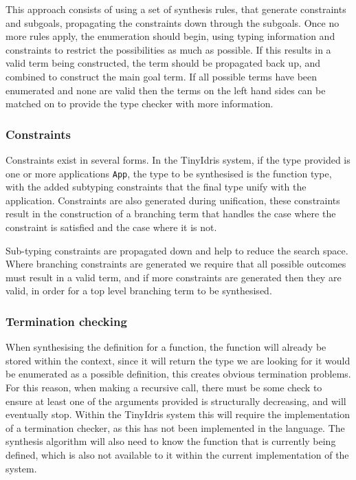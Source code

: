 \documentclass[a4paper]{article}
\begin{document}
This approach consists of using a set of synthesis rules, that generate constraints 
and subgoals, propagating the constraints down through the subgoals. Once no more rules apply, the enumeration should begin, using 
typing information and constraints to restrict the possibilities as much as possible. If this results in a valid term being constructed, the term should be 
propagated back up, and combined to construct the main goal term. If all possible terms have been enumerated and none are valid then 
the terms on the left hand sides can be matched on to provide the type checker with more information. 

\subsubsection{Constraints}
\label{sec:org233733e}
Constraints exist in several forms. In the TinyIdris system, if the type provided is one or more  
applications \texttt{App}, the type to be synthesised is the function type, with the added subtyping constraints that the final type unify with
the application. Constraints are also generated during unification, these constraints result in the construction of a 
branching term that handles the case where the constraint is satisfied and the case where it is not. 

Sub-typing constraints are propagated down and help to reduce the search space. Where branching constraints are 
generated we require that all possible outcomes must result in a valid term, and if more constraints are generated
then they are valid, in order for a top level branching term to be synthesised.
\subsubsection{Termination checking}
\label{sec:org1f33d4d}
When synthesising the definition for a function, the function will already be stored within the context, since it will 
return the type we are looking for it would be enumerated as a possible definition, this creates obvious termination 
problems. For this reason, when making a recursive call, there must be some check to ensure at least one of the 
arguments provided is structurally decreasing, and will eventually stop. Within the TinyIdris system this will require the 
implementation of a termination checker, as this has not been implemented in the language. The synthesis algorithm will also need to know 
the function that is currently being defined, which is also not available to it within the current implementation of the 
system. 
\end{document}
